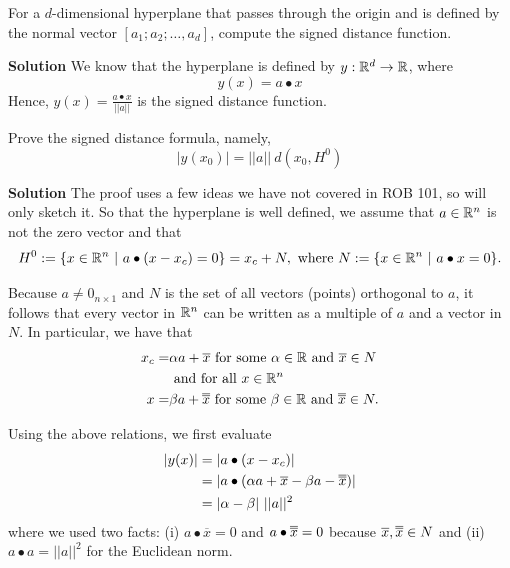 \begin{example}
\label{ex:SignedDistance03} For a $d$-dimensional hyperplane that passes through the origin and is defined by the normal vector $[a_1;a_2; \ldots, a_d]$, compute the signed distance function.
\end{example}

\textbf{Solution} We know that the hyperplane is defined by $y:\mathbb R^d \to \mathbb R$, where 
$$y(x)=a\bullet x$$
Hence, $y(x)=\frac{a\bullet x}{||a||}$ is the signed distance function.
\Qed


\begin{example}
\label{ex:exampleSignedDistanceProof} Prove the signed distance formula, namely, 
\begin{equation}
\label{eq:SignedDistanceFormula}
    |y(x_0)| = ||a|| ~d(x_0, H^0)  
\end{equation}

\end{example}

\textbf{Solution} The proof uses a few ideas we have not covered in ROB 101, so will only sketch it. So that the hyperplane is well defined, we assume that $a \in \mathbb R^n$ is not the zero vector and that 
\begin{equation}
\label{eq:TranslateOfHypersubspace}
    H^0:=\{x\in \mathbb R^n~|~a\bullet(x - x_c)=0 \} = x_c + N, \text{ where } N:=\{x\in \mathbb R^n~|~a \bullet x=0 \}.
\end{equation}

Because $a \neq 0_{n \times 1}$ and $N$ is the set of all vectors (points) orthogonal to $a$, it follows that every vector in $\mathbb R^n$ can be written as a multiple of $a$ and a vector in $N$. In particular, we have that 
\begin{align*}
    x_c = & \alpha a + \overline{x} \text{ for some } \alpha \in \real \text{ and } \overline{x} \in N\\
    & \text{ and for all } x\in \real^n \\
    x  = &\beta a  + \doverline{x} \text{ for some } \beta \in \real \text{ and } \doverline{x} \in N. 
\end{align*}

Using the above relations, we first evaluate 
\begin{align*}
    |y(x)| & = | a \bullet (x - x_c) | \\
    & =  | a \bullet (\alpha a + \overline{x} - \beta a  - \doverline{x}) | \\
    & = |\alpha -\beta|~ ||a||^2
\end{align*}
where we used two facts: (i) $a \bullet \overline{x} = 0$ and  $a \bullet \doverline{x} = 0$ because $\overline{x}, \doverline{x} \in N$ and (ii) $a \bullet a = ||a||^2$ for the Euclidean norm.\\


